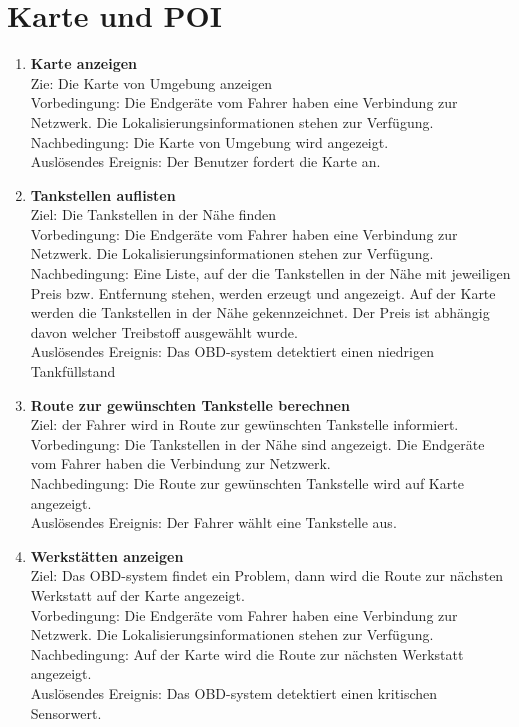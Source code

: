 \documentclass[pflichtenheft.tex]{subfiles}
\begin{document}
	
	\section{\textbf{Karte und POI}}
	
	\begin{enumerate}
	\setcounter{enumi}{\value{enumTemp}}
	\item{\textbf{Karte anzeigen}}
		\\Zie: Die Karte von Umgebung anzeigen
		\\Vorbedingung: Die Endgeräte vom Fahrer haben eine Verbindung zur Netzwerk.
		Die Lokalisierungsinformationen stehen zur Verfügung.
		\\Nachbedingung: Die Karte von Umgebung wird angezeigt.
  	 	\\Auslösendes Ereignis: Der Benutzer fordert die Karte an.
  	\item {\textbf{Tankstellen auflisten}}
		\\Ziel: Die Tankstellen in der Nähe finden
		\\Vorbedingung: Die Endgeräte vom Fahrer haben eine Verbindung zur Netzwerk.
		Die Lokalisierungsinformationen stehen zur Verfügung.
		\\Nachbedingung: Eine Liste, auf der die Tankstellen in der Nähe mit
		jeweiligen Preis bzw. Entfernung stehen, werden erzeugt und angezeigt. Auf der
		Karte werden die Tankstellen in der Nähe gekennzeichnet. 
		Der Preis ist abhängig davon welcher Treibstoff ausgewählt wurde.
		\\Auslösendes Ereignis: Das OBD-system detektiert einen niedrigen
		Tankfüllstand
  	
  	\item {\textbf{Route zur gewünschten Tankstelle berechnen}}
  		\\Ziel: der Fahrer wird in Route zur gewünschten Tankstelle informiert. 
  		\\Vorbedingung: Die Tankstellen in der Nähe sind angezeigt. Die Endgeräte
  		vom Fahrer haben die Verbindung zur Netzwerk.
  		\\Nachbedingung: Die Route zur gewünschten Tankstelle wird auf Karte
  		angezeigt.
   		\\Auslösendes Ereignis: Der Fahrer wählt eine Tankstelle aus.
  
	\item{\textbf{Werkstätten anzeigen}} 
		\\Ziel: Das OBD-system findet ein Problem, dann wird die Route zur nächsten
		Werkstatt auf der Karte angezeigt.
		\\Vorbedingung: Die Endgeräte vom Fahrer haben eine Verbindung zur Netzwerk.
		Die Lokalisierungsinformationen stehen zur Verfügung.
		\\Nachbedingung: Auf der Karte wird die Route zur nächsten Werkstatt
		angezeigt.
	 	\\Auslösendes Ereignis: Das OBD-system detektiert einen kritischen Sensorwert.

	\setcounter{enumTemp}{\value{enumi}}
	\end{enumerate}
\end{document}
